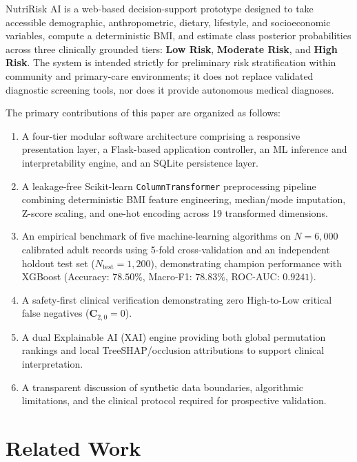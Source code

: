 \documentclass[conference]{IEEEtran}
\begin{document}
NutriRisk AI is a web-based decision-support prototype designed to take accessible demographic, anthropometric, dietary, lifestyle, and socioeconomic variables, compute a deterministic BMI, and estimate class posterior probabilities across three clinically grounded tiers: \textbf{Low Risk}, \textbf{Moderate Risk}, and \textbf{High Risk}. The system is intended strictly for preliminary risk stratification within community and primary-care environments; it does not replace validated diagnostic screening tools, nor does it provide autonomous medical diagnoses. 

The primary contributions of this paper are organized as follows:
\begin{enumerate}
    \item A four-tier modular software architecture comprising a responsive presentation layer, a Flask-based application controller, an ML inference and interpretability engine, and an SQLite persistence layer.
    \item A leakage-free Scikit-learn \texttt{ColumnTransformer} preprocessing pipeline combining deterministic BMI feature engineering, median/mode imputation, Z-score scaling, and one-hot encoding across 19 transformed dimensions.
    \item An empirical benchmark of five machine-learning algorithms on $N = 6{,}000$ calibrated adult records using 5-fold cross-validation and an independent holdout test set ($N_{\text{test}} = 1{,}200$), demonstrating champion performance with XGBoost (Accuracy: $78.50\%$, Macro-F1: $78.83\%$, ROC-AUC: $0.9241$).
    \item A safety-first clinical verification demonstrating zero High-to-Low critical false negatives ($\mathbf{C}_{2,0} = 0$).
    \item A dual Explainable AI (XAI) engine providing both global permutation rankings and local TreeSHAP/occlusion attributions to support clinical interpretation.
    \item A transparent discussion of synthetic data boundaries, algorithmic limitations, and the clinical protocol required for prospective validation.
\end{enumerate}

\section{Related Work}
\label{sec:related}
\end{document}
